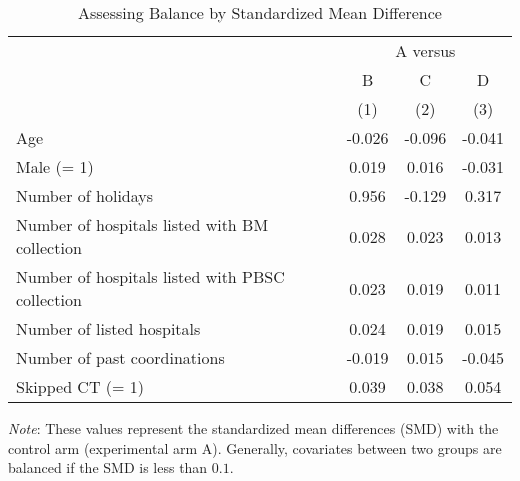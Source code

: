 \documentclass[12pt, a4paper]{article}
\begin{document}
\begin{table}[H]

\caption{\label{tab:smd-balance}Assessing Balance by Standardized Mean Difference}
\centering
\fontsize{8}{10}\selectfont
\begin{threeparttable}
\begin{tabular}[t]{lccc}
\toprule
\multicolumn{1}{c}{ } & \multicolumn{3}{c}{A versus} \\
\cmidrule(l{3pt}r{3pt}){2-4}
\multicolumn{1}{c}{ } & \multicolumn{1}{c}{B} & \multicolumn{1}{c}{C} & \multicolumn{1}{c}{D} \\
\cmidrule(l{3pt}r{3pt}){2-2} \cmidrule(l{3pt}r{3pt}){3-3} \cmidrule(l{3pt}r{3pt}){4-4}
 & (1) & (2) & (3)\\
\midrule
Age & -0.026 & -0.096 & -0.041\\
Male (= 1) & 0.019 & 0.016 & -0.031\\
Number of holidays & 0.956 & -0.129 & 0.317\\
Number of hospitals listed with BM collection & 0.028 & 0.023 & 0.013\\
Number of hospitals listed with PBSC collection & 0.023 & 0.019 & 0.011\\
Number of listed hospitals & 0.024 & 0.019 & 0.015\\
Number of past coordinations & -0.019 & 0.015 & -0.045\\
Skipped CT (= 1) & 0.039 & 0.038 & 0.054\\
\bottomrule
\end{tabular}
\begin{tablenotes}
\item \emph{Note}: These values represent the standardized mean differences (SMD) with the control arm (experimental arm A). Generally, covariates between two groups are balanced if the SMD is less than $0.1$.
\end{tablenotes}
\end{threeparttable}
\end{table}
\end{document}
